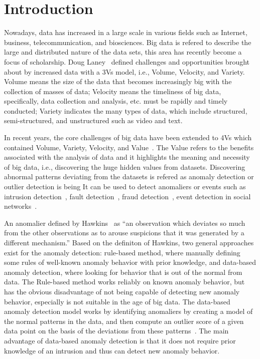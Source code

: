 \section{Introduction}\label{sec-intro}

Nowadays,
data has increased in a large scale
in various fields such as Internet,
business,
telecommunication,
and biosciences.
Big data is refered to describe
the large and distributed
nature of the data sets,
this area has recently become a focus of scholarship.
Doug Laney~\cite{laney01controlling3v} defined challenges
and opportunities brought about by increased data
with a 3Vs model,
i.e., Volume,
Velocity,
and Variety.
Volume means the size of the data that becomes increasingly big
with the collection of masses of data;
Velocity means the timeliness of big data,
specifically,
data collection and analysis,
etc. must be rapidly and timely conducted;
Variety indicates the many types of data,
which include structured,
semi-structured,
and unstructured such as video and text.

In recent years,
the core challenges of big data
have been extended to 4Vs which
contained Volume,
Variety,
Velocity,
and Value~\cite{gantz2011extracting}.
The Value refers to the benefits associated with
the analysis of data and it highlights
the meaning and necessity of big data,
i.e.,
discovering the huge hidden values from datasets.
Discovering abnormal patterns
deviating from the
datasets is refered as anomaly detection or outlier detection
is being
It can be used to detect anomaliers or
events such as
intrusion detection~\cite{garcia2009anomaly},
fault detection~\cite{hwang2009survey},
fraud detection~\cite{bolton2002statistical},
event detection in social networks~\cite{sakaki2010earthquake}.

An anomalier defined by Hawkins~\cite{hawkins1980identification}
as ``an observation which
deviates so much from the other observations
as to arouse suspicions that
it was generated by a different mechanism.''
Based on the definiton of Hawkins,
two general approaches exist for the anomaly
detection:
rule-based method,
where manually defining some rules of
well-known anomaly behavior
with prior knowledge,
and data-based anomaly detection,
where looking for behavior that
is out of the normal from data.
The Rule-based method works
reliably on known anomaly behavior,
but has the obvious disadvantage of
not being capable of
detecting new anomaly behavior,
especially is not suitable in the age of big data.
The data-based anomaly detection model works by
identifying anomaliers by creating a model of
the normal patterns in the data,
and then compute an outlier score of
a given data point on the basis of
the deviations from these patterns~\cite{chandola2009anomaly}.
The main advantage of data-based anomaly detection is that
it does not require prior knowledge of
an intrusion and thus can detect new anomaly behavior.


